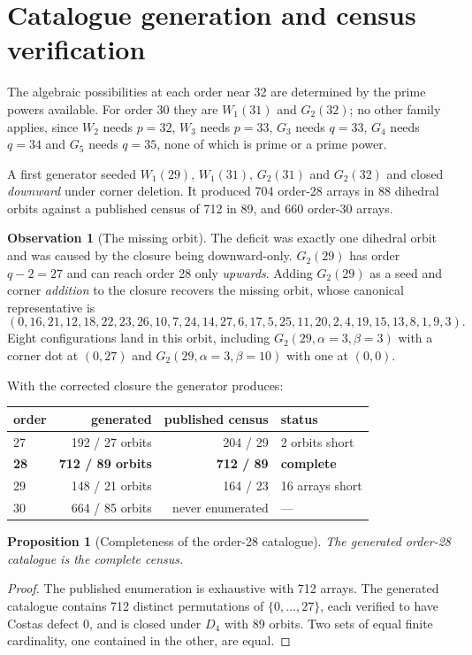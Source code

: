 \documentclass[11pt,a4paper,oneside]{report}
\newtheorem{proposition}[theorem]{Proposition}
\theoremstyle{definition}
\newtheorem{observation}[theorem]{Observation}
\begin{document}
\section{Catalogue generation and census verification}
\label{p2-sec:catalogue}

The algebraic possibilities at each order near 32 are determined by the prime
powers available. For order 30 they are $W_1(31)$ and $G_2(32)$; no other family
applies, since $W_2$ needs $p=32$, $W_3$ needs $p=33$, $G_3$ needs $q=33$, $G_4$
needs $q=34$ and $G_5$ needs $q=35$, none of which is prime or a prime power.

A first generator seeded $W_1(29)$, $W_1(31)$, $G_2(31)$ and $G_2(32)$ and
closed \emph{downward} under corner deletion. It produced 704 order-28 arrays in
88 dihedral orbits against a published census of 712 in 89, and 660 order-30
arrays.

\begin{observation}[The missing orbit]
\label{p2-obs:missing}
The deficit was exactly one dihedral orbit and was caused by the closure being
downward-only. $G_2(29)$ has order $q-2 = 27$ and can reach order 28 only
\emph{upwards}. Adding $G_2(29)$ as a seed and corner \emph{addition} to the
closure recovers the missing orbit, whose canonical representative is
\[
(0,16,21,12,18,22,23,26,10,7,24,14,27,6,17,5,25,11,20,2,4,19,15,13,8,1,9,3).
\]
Eight configurations land in this orbit, including $G_2(29,\alpha=3,\beta=3)$
with a corner dot at $(0,27)$ and $G_2(29,\alpha=3,\beta=10)$ with one at
$(0,0)$.
\end{observation}

With the corrected closure the generator produces:

\begin{center}
\begin{tabular}{@{}lrrl@{}}
\toprule
order & generated & published census & status \\
\midrule
27 & 192 / 27 orbits & 204 / 29 & 2 orbits short \\
\textbf{28} & \textbf{712 / 89 orbits} & \textbf{712 / 89} & \textbf{complete} \\
29 & 148 / 21 orbits & 164 / 23 & 16 arrays short \\
30 & 664 / 85 orbits & never enumerated & --- \\
\bottomrule
\end{tabular}
\end{center}

\begin{proposition}[Completeness of the order-28 catalogue]
The generated order-28 catalogue is the complete census.
\end{proposition}
\begin{proof}
The published enumeration is exhaustive with 712 arrays. The generated
catalogue contains 712 distinct permutations of $\{0,\dots,27\}$, each verified
to have Costas defect 0, and is closed under $D_4$ with 89 orbits. Two sets of
equal finite cardinality, one contained in the other, are equal.
\end{proof}
\end{document}

